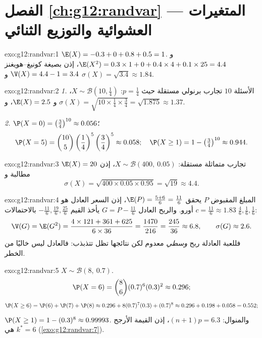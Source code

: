 \section*{الفصل \ref{ch:g12:randvar} --- المتغيرات العشوائية والتوزيع الثنائي}

\begin{solution}{exo:g12:randvar:1}
$\E(X) = -0.3 + 0 + 0.8 + 0.5 = 1$.
و $\E(X^2) = 0.3 \times 1 + 0 + 0.4\times4 + 0.1\times25 = 4.4$، إذن بصيغة
كونيغ--هويغنز $\V(X) = 4.4 - 1 = 3.4$ و
$\sigma(X) = \sqrt{3.4} \approx 1.84$.
\end{solution}

\begin{solution}{exo:g12:randvar:2}
\emph{1.} الأسئلة $10$ تجارب برنولي مستقلة حيث
$p = \frac14$: $X \sim \mathcal B\left(10, \frac14\right)$،
و $\E(X) = 2.5$،
و $\sigma(X) = \sqrt{10 \times \frac14 \times \frac34} = \sqrt{1.875}
\approx 1.37$.

\emph{2.} $\P(X = 0) = \left(\frac34\right)^{10} \approx 0.056$؛
\[
\P(X = 5) = \binom{10}{5}\left(\frac14\right)^5\left(\frac34\right)^5
\approx 0.058;
\quad
\P(X \geq 1) = 1 - \left(\tfrac34\right)^{10} \approx 0.944 .
\]
\end{solution}

\begin{solution}{exo:g12:randvar:3}
تجارب متماثلة مستقلة: $X \sim \mathcal B(400,\ 0.05)$، إذن
$\E(X) = 20$ مطالبة و
\[
\sigma(X) = \sqrt{400 \times 0.05 \times 0.95} = \sqrt{19} \approx 4.4 .
\]
\end{solution}

\begin{solution}{exo:g12:randvar:4}
المبلغ المقبوض $P$ يحقق
$\E(P) = \frac{5 + 6}{6} = \frac{11}{6}$، إذن السعر العادل هو
$c = \frac{11}{6} \approx 1.83$ أورو. والربح العادل $G = P - \frac{11}6$
يأخذ القيم $-\frac{11}{6}, \frac{19}{6}, \frac{25}{6}$ بالاحتمالات
$\frac46, \frac16, \frac16$:
\[
\V(G) = \E(G^2)
= \frac{4 \times 121 + 361 + 625}{6 \times 36} = \frac{1470}{216}
= \frac{245}{36} \approx 6.8,
\qquad \sigma(G) \approx 2.6 .
\]
فللعبة العادلة ربح \emph{وسطي} معدوم لكن نتائجها تظل تتذبذب:
فالعادل ليس خاليًا من الخطر.
\end{solution}

\begin{solution}{exo:g12:randvar:5}
$X \sim \mathcal B(8,\ 0.7)$.
\[
\P(X = 6) = \binom86 (0.7)^6(0.3)^2 \approx 0.296 ;
\]
\[
\P(X \geq 6) = \P(6) + \P(7) + \P(8)
\approx 0.296 + 8(0.7)^7(0.3) + (0.7)^8
\approx 0.296 + 0.198 + 0.058 = 0.552 ;
\]
$\P(X \geq 1) = 1 - (0.3)^8 \approx 0.99993$. والمنوال:
$(n+1)p = 6.3$، إذن القيمة الأرجح هي $k^* = 6$
(\cref{exo:g12:randvar:7}).
\end{solution}

